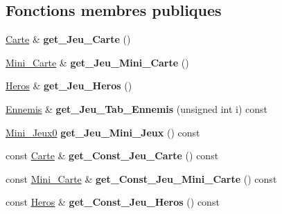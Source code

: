 \subsection*{Fonctions membres publiques}
\begin{DoxyCompactItemize}
\item 
\hypertarget{classJeu_a3c772a7fcdc7c9abe109ba41515e42c3}{\hyperlink{classCarte}{Carte} \& {\bfseries get\+\_\+\+Jeu\+\_\+\+Carte} ()}\label{classJeu_a3c772a7fcdc7c9abe109ba41515e42c3}

\item 
\hypertarget{classJeu_a944deec1fd22c99879921bee37d87eac}{\hyperlink{classMini__Carte}{Mini\+\_\+\+Carte} \& {\bfseries get\+\_\+\+Jeu\+\_\+\+Mini\+\_\+\+Carte} ()}\label{classJeu_a944deec1fd22c99879921bee37d87eac}

\item 
\hypertarget{classJeu_a98abd23fba88684cfb141c3159b14074}{\hyperlink{classHeros}{Heros} \& {\bfseries get\+\_\+\+Jeu\+\_\+\+Heros} ()}\label{classJeu_a98abd23fba88684cfb141c3159b14074}

\item 
\hypertarget{classJeu_a08e8f7ec1740bfdfd07e6ddc9c6985c9}{\hyperlink{classEnnemis}{Ennemis} \& {\bfseries get\+\_\+\+Jeu\+\_\+\+Tab\+\_\+\+Ennemis} (unsigned int i) const }\label{classJeu_a08e8f7ec1740bfdfd07e6ddc9c6985c9}

\item 
\hypertarget{classJeu_a600433d17f9474bfea664d43860a9853}{\hyperlink{classMini__Jeux0}{Mini\+\_\+\+Jeux0} {\bfseries get\+\_\+\+Jeu\+\_\+\+Mini\+\_\+\+Jeux} () const }\label{classJeu_a600433d17f9474bfea664d43860a9853}

\item 
\hypertarget{classJeu_a179a7776a4087957fe7e539522741a36}{const \hyperlink{classCarte}{Carte} \& {\bfseries get\+\_\+\+Const\+\_\+\+Jeu\+\_\+\+Carte} () const }\label{classJeu_a179a7776a4087957fe7e539522741a36}

\item 
\hypertarget{classJeu_ad7ff0fe6fa9af3c581305d6d07dba59b}{const \hyperlink{classMini__Carte}{Mini\+\_\+\+Carte} \& {\bfseries get\+\_\+\+Const\+\_\+\+Jeu\+\_\+\+Mini\+\_\+\+Carte} () const }\label{classJeu_ad7ff0fe6fa9af3c581305d6d07dba59b}

\item 
\hypertarget{classJeu_a91ec2b72f7046a1522fda3be53e8948c}{const \hyperlink{classHeros}{Heros} \& {\bfseries get\+\_\+\+Const\+\_\+\+Jeu\+\_\+\+Heros} () const }\label{classJeu_a91ec2b72f7046a1522fda3be53e8948c}


\end{DoxyCompactItemize}
